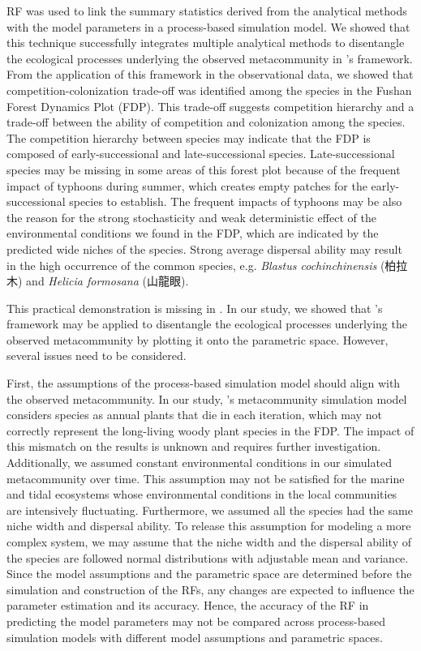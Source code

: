 RF was used to link the summary statistics derived from the analytical methods with the model parameters in a process-based simulation model. We showed that this technique successfully integrates multiple analytical methods to disentangle the ecological processes underlying the observed metacommunity in \citeauthor{guzman2022accounting}'s framework. From the application of this framework in the observational data, we showed that competition-colonization trade-off was identified among the species in the Fushan Forest Dynamics Plot (FDP). This trade-off suggests competition hierarchy and a trade-off between the ability of competition and colonization among the species. The competition hierarchy between species may indicate that the FDP is composed of early-successional and late-successional species. Late-successional species may be missing in some areas of this forest plot because of the frequent impact of typhoons during summer, which creates empty patches for the early-successional species to establish. The frequent impacts of typhoons may be also the reason for the strong stochasticity and weak deterministic effect of the environmental conditions we found in the FDP, which are indicated by the predicted wide niches of the species. Strong average dispersal ability may result in the high occurrence of the common species, e.g. \textit{Blastus cochinchinensis} (柏拉木) and \textit{Helicia formosana} (山龍眼). 

This practical demonstration is missing in \citet{guzman2022accounting}. In our study, we showed that \citeauthor{guzman2022accounting}'s framework may be applied to disentangle the ecological processes underlying the observed metacommunity by plotting it onto the parametric space. However, several issues need to be considered.

First, the assumptions of the process-based simulation model should align with the observed metacommunity. In our study, \citeauthor{thompson2020process}'s metacommunity simulation model considers species as annual plants that die in each iteration, which may not correctly represent the long-living woody plant species in the FDP. The impact of this mismatch on the results is unknown and requires further investigation. Additionally, we assumed constant environmental conditions in our simulated metacommunity over time. This assumption may not be satisfied for the marine and tidal ecosystems whose environmental conditions in the local communities are intensively fluctuating. Furthermore, we assumed all the species had the same niche width and dispersal ability. To release this assumption for modeling a more complex system, we may assume that the niche width and the dispersal ability of the species are followed normal distributions with adjustable mean and variance. Since the model assumptions and the parametric space are determined before the simulation and construction of the RFs, any changes are expected to influence the parameter estimation and its accuracy. Hence, the accuracy of the RF in predicting the model parameters may not be compared across process-based simulation models with different model assumptions and parametric spaces.


